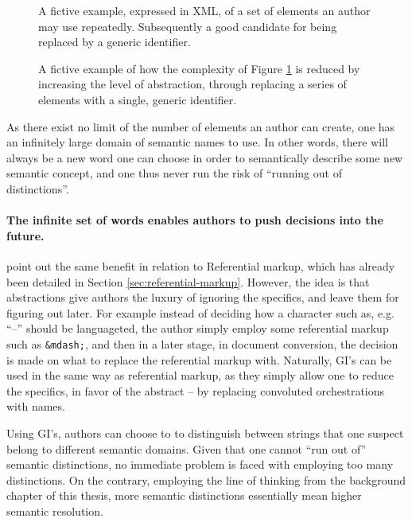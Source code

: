 \documentclass{scrreprt}
\begin{document}
\begin{figure}[h]
\centering
{}
\caption{A fictive example, expressed in XML, of a set of elements an author may use repeatedly. Subsequently a good candidate for being replaced by a generic identifier.}
\label{fig:gi-abstraction-before}
\end{figure}

\begin{figure}[h]
\centering
{}
\caption{A fictive example of how the complexity of Figure \ref{fig:gi-abstraction-before} is reduced by increasing the level of abstraction, through replacing a series of elements with a single, generic identifier.}
\label{fig:gi-abstraction-after}
\end{figure}


As there exist no limit of the number of elements an author can create, one has an infinitely large domain of semantic names to use. In other words, there will always be a new word one can choose in order to semantically describe some new semantic concept, and one thus never run the risk of ``running out of distinctions''.

\paragraph{The infinite set of words enables authors to push decisions into the future.} \citet{coombs} point out the same benefit in relation to Referential markup, which has already been detailed in Section \ref{sec:referential-markup}. However, the idea is that abstractions give authors the luxury of ignoring the specifics, and leave them for figuring out later. For example instead of deciding how a character such as, e.g. ``--'' should be languageted, the author simply employ some referential markup such as \texttt{\&mdash;}, and then in a later stage, in document conversion, the decision is made on what to replace the referential markup with. Naturally, GI's can be used in the same way as referential markup, as they simply allow one to reduce the specifics, in favor of the abstract -- by replacing convoluted orchestrations with names.

Using GI's, authors can choose to to distinguish between strings that one suspect belong to different semantic domains. Given that one cannot ``run out of'' semantic distinctions, no immediate problem is faced with employing too many distinctions. On the contrary, employing the line of thinking from the background chapter of this thesis, more semantic distinctions essentially mean higher semantic resolution. 
\end{document}

